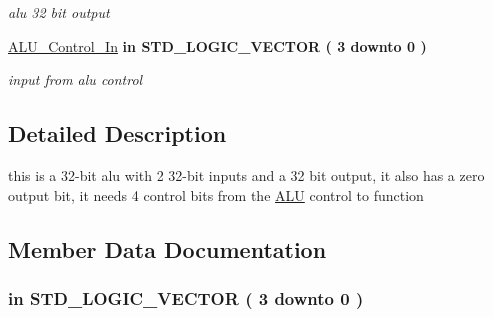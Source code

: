 \begin{DoxyCompactItemize}
\begin{DoxyCompactList}\small\item\em alu 32 bit output \end{DoxyCompactList}\item 
\hyperlink{class_a_l_u_a9ea12157ac75337610ea73ec756eca4c}{A\-L\-U\-\_\-\-Control\-\_\-\-In}  {\bfseries {\bfseries \textcolor{vhdlkeyword}{in}\textcolor{vhdlchar}{ }}} {\bfseries \textcolor{comment}{S\-T\-D\-\_\-\-L\-O\-G\-I\-C\-\_\-\-V\-E\-C\-T\-O\-R}\textcolor{vhdlchar}{ }\textcolor{vhdlchar}{(}\textcolor{vhdlchar}{ }\textcolor{vhdlchar}{ } \textcolor{vhdldigit}{3} \textcolor{vhdlchar}{ }\textcolor{vhdlchar}{ }\textcolor{vhdlchar}{ }\textcolor{vhdlkeyword}{downto}\textcolor{vhdlchar}{ }\textcolor{vhdlchar}{ }\textcolor{vhdlchar}{ } \textcolor{vhdldigit}{0} \textcolor{vhdlchar}{ }\textcolor{vhdlchar}{)}\textcolor{vhdlchar}{ }} 
\begin{DoxyCompactList}\small\item\em input from alu control \end{DoxyCompactList}\end{DoxyCompactItemize}


\subsection{Detailed Description}
this is a 32-\/bit alu with 2 32-\/bit inputs and a 32 bit output, it also has a zero output bit, it needs 4 control bits from the \hyperlink{class_a_l_u}{A\-L\-U} control to function 

\subsection{Member Data Documentation}
\hypertarget{class_a_l_u_a9ea12157ac75337610ea73ec756eca4c}{
\subsubsection[{A\-L\-U\-\_\-\-Control\-\_\-\-In}]{ {\bfseries \textcolor{vhdlkeyword}{in}\textcolor{vhdlchar}{ }} {\bfseries \textcolor{comment}{S\-T\-D\-\_\-\-L\-O\-G\-I\-C\-\_\-\-V\-E\-C\-T\-O\-R}\textcolor{vhdlchar}{ }\textcolor{vhdlchar}{(}\textcolor{vhdlchar}{ }\textcolor{vhdlchar}{ } \textcolor{vhdldigit}{3} \textcolor{vhdlchar}{ }\textcolor{vhdlchar}{ }\textcolor{vhdlchar}{ }\textcolor{vhdlkeyword}{downto}\textcolor{vhdlchar}{ }\textcolor{vhdlchar}{ }\textcolor{vhdlchar}{ } \textcolor{vhdldigit}{0} \textcolor{vhdlchar}{ }\textcolor{vhdlchar}{)}\textcolor{vhdlchar}{ }} \hspace{0.3cm}{\ttfamily [Port]}}}\label{class_a_l_u_a9ea12157ac75337610ea73ec756eca4c}


